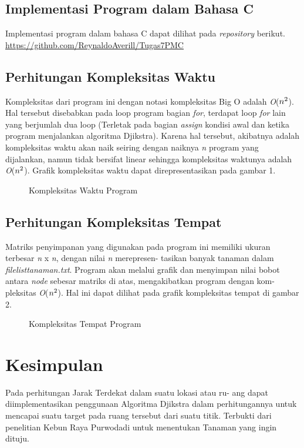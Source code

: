 \documentclass[conference]{IEEEtran}
\begin{document}
\subsection{Implementasi Program dalam Bahasa C}
    Implementasi program dalam bahasa C dapat dilihat
    pada \emph{repository} berikut. \url{https://github.com/ReynaldoAverill/Tugas7PMC}
    
\subsection{Perhitungan Kompleksitas Waktu}
    Kompleksitas dari program ini dengan notasi kompleksitas
    Big  O  adalah \emph{O}($n\sp{2}$).  Hal  tersebut  disebabkan  pada  loop
    program  bagian \emph{for},  terdapat  loop \emph{for} lain  yang  berjumlah
    dua loop (Terletak pada bagian \emph{assign} kondisi awal dan ketika
    program menjalankan algoritma Djikstra). Karena hal tersebut,
    akibatnya adalah kompleksitas waktu akan naik seiring dengan
    naiknya \emph{n} program  yang  dijalankan,  namun  tidak  bersifat
    linear sehingga kompleksitas waktunya adalah \emph{O}($n\sp{2}$). Grafik
    kompleksitas waktu dapat direpresentasikan pada gambar 1.
    \setlength{\intextsep}{0pt} 
\begin{figure}[htbp]
    \centering
    \scalebox{0.25}{}
    \caption{Kompleksitas Waktu Program}
\end{figure}

\subsection{Perhitungan Kompleksitas Tempat}
    Matriks  penyimpanan  yang  digunakan  pada  program  ini
    memiliki  ukuran  terbesar \emph{n} x \emph{n},  dengan  nilai \emph{n} merepresen-
    tasikan  banyak  tanaman  dalam  \emph{filelisttanaman.txt}.  Program
    akan  melalui  grafik  dan  menyimpan  nilai  bobot  antara \emph{node}
    sebesar matriks di atas, mengakibatkan program dengan kom-
    pleksitas \emph{O}($n\sp{2}$). Hal ini dapat dilihat pada grafik kompleksitas
    tempat di gambar 2.
    \setlength{\intextsep}{0pt} 
\begin{figure}[htbp]
    \centering
    \scalebox{0.25}{}
    \caption{Kompleksitas Tempat Program}
\end{figure}
\setlength{\intextsep}{5pt} 

\section{Kesimpulan}
    Pada perhitungan Jarak Terdekat dalam suatu lokasi atau ru-
    ang dapat diimplementasikan penggunaan Algoritma Djikstra
    dalam perhitungannya untuk mencapai suatu target pada ruang
    tersebut  dari suatu  titik.  Terbukti dari  penelitian Kebun  Raya
    Purwodadi untuk menentukan Tanaman yang ingin dituju.



\end{document}
